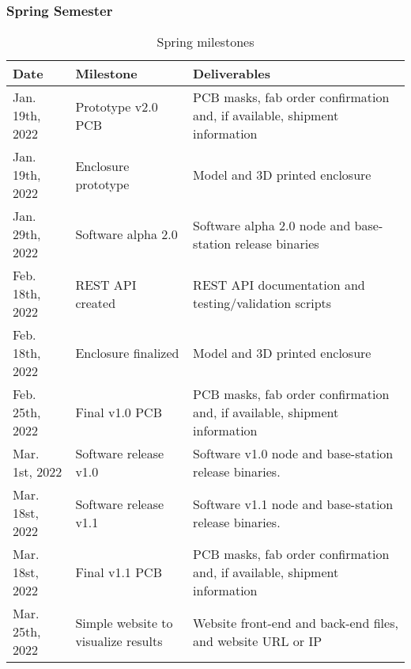 \subsubsection{Spring Semester}
%
%
\begin{table}[H]
    \begin{tabularx}{\linewidth}{|X|X|X|}
        \hline
        Date & Milestone & Deliverables \\
        \hline\hline
        Jan. 19th, 2022 
        & Prototype v2.0 PCB 
        & PCB masks, fab order confirmation and, if available, shipment information \\
        
        \hline
        Jan. 19th, 2022
        & Enclosure prototype
        & Model and 3D printed enclosure
        \\
        
        \hline
        Jan. 29th, 2022 
        & Software alpha 2.0 
        & Software alpha 2.0 node and base-station release binaries
        \\
        
        \hline
        Feb. 18th, 2022
        & REST API created
        & REST API documentation and testing/validation scripts
        \\
        
        \hline
        Feb. 18th, 2022
        & Enclosure finalized
        & Model and 3D printed enclosure
        \\
        
        \hline
        Feb. 25th, 2022
        & Final v1.0 PCB
        & PCB masks, fab order confirmation and, if available, shipment information 
        \\
        
        \hline
        Mar. 1st, 2022
        & Software release v1.0
        & Software v1.0 node and base-station release binaries. 
        \\ 
        
        \hline
        Mar. 18st, 2022
        & Software release v1.1
        & Software v1.1 node and base-station release binaries. 
        \\ 
        
        \hline
        Mar. 18st, 2022
        & Final v1.1 PCB
        & PCB masks, fab order confirmation and, if available, shipment information 
        \\
        
        \hline
        Mar. 25th, 2022
        & Simple website to visualize results
        & Website front-end and back-end files, and website URL or IP
        \\
        
        \hline
    \end{tabularx}
    \caption{Spring milestones}
\end{table}
